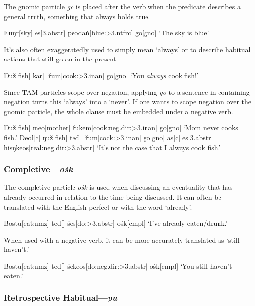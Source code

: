 \documentclass[a4paper,11pt,oneside,openany]{memoir}
\newcommand{\vd}{ď}
\newcommand{\vz}{ž}
\newcommand{\vr}{ř}
\newcommand{\vn}{ň}
\newcommand{\Engma}{Ŋ}
\newcommand{\engma}{ŋ}
\begin{document}
The gnomic particle \textit{go} is placed after the verb when the predicate describes a general truth, something that always holds true.

\ex
\begingl
Eu\engma r[sky]
es[\sc 3.abstr]
peoda\vn[blue:{\sc >3.ntfrc}]
go[\sc gno]
\glft `The sky is blue'
\endgl
\xe

It's also often exaggeratedly used to simply mean `always' or to describe habitual actions that still go on in the present.

\ex 
\begingl
\Engma u\vz[fish]
kar[]
\vr um[cook:{\sc >3.inan}]
go[\sc gno]
\nogloss{!}
\glft `You \emph{always} cook fish!'
\endgl
\xe

Since TAM particles scope over negation, applying \textit{go} to a sentence in containing negation turns this `always' into a `never'. If one wants to scope negation over the gnomic particle, the whole clause must be embedded under a negative verb.

\pex 
\a 
\begingl
\Engma u\vz[fish]
meo[mother]
\vr ukem[cook:{\sc neg.dir:>3.inan}]
go[\sc gno]
\glft `Mom never cooks fish.'
\endgl
\a 
\begingl
Deo\l[\sc c]
\engma u\vz[fish]
te\vd[]
\vr um[cook:{\sc >3.inan}]
go[\sc gno]
\nogloss{,}
as[\sc c]
es[\sc 3.abstr]
his\engma keos[real:{\sc neg.dir:>3.abstr}]
\glft `It's not the case that I always cook fish.'
\endgl
\xe

\subsubsection{Completive---\textit{o\'sk}}

The completive particle \textit{o\'sk} is used when discussing an eventuality that has already occurred in relation to the time being discussed. It can often be translated with the English perfect or with the word `already'.

\ex 
\begingl
Bostu[eat:{\sc nmz}]
te\vd[]
\'ses[do:{\sc >3.abstr}]
o\'sk[\sc cmpl]
\glft `I've already eaten/drunk.'
\endgl
\xe

When used with a negative verb, it can be more accurately translated as `still haven't.'

\ex 
\begingl
Bostu[eat:{\sc nmz}]
te\vd[]
\'sekeos[do:{\sc neg.dir:>3.abstr}]
o\'sk[\sc cmpl]
\glft `You still haven't eaten.'
\endgl
\xe

\subsubsection{Retrospective Habitual---\textit{pu}}
\end{document}
